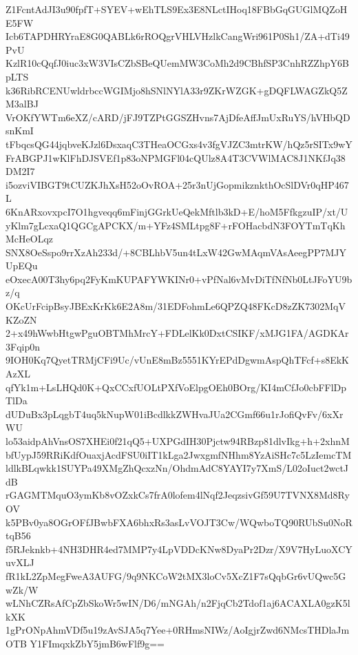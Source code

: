 Z1FcntAdJI3u90fpfT+SYEV+wEhTLS9Ex3E8NLctIHoq18FBbGqGUGlMQZoHE5FW
Icb6TAPDHRYraE8G0QABLk6rROQgrVHLVHzlkCangWri961P0Sh1/ZA+dTi49PvU
KzlR10cQqfJ0iuc3xW3VIsCZbSBeQUemMW3CoMh2d9CBhfSP3CnhRZZhpY6BpLTS
k36RibRCENUwldrbccWGIMjo8hSNlNYlA33r9ZKrWZGK+gDQFLWAGZkQ5ZM3alBJ
VrOKfYWTm6eXZ/cARD/jFJ9TZPtGGSZHvns7AjDfeAffJmUxRuYS/hVHbQDsnKmI
tFbqcsQG44jqbveKJzl6DsxaqC3THeaOCGxs4v3fgVJZC3mtrKW/hQz5rSITx9wY
FrABGPJ1wKlFhDJSVEf1p83oNPMGFl04cQUlz8A4T3CVWlMAC8J1NKfJq38DM2I7
i5ozviVIBGT9tCUZKJhXsH52oOvROA+25r3nUjGopmikznkthOcSlDVr0qHP467L
6KnARxovxpcI7O1hgveqq6mFinjGGrkUeQekMftlb3kD+E/hoM5FfkgzuIP/xt/U
yKlm7gLcxaQ1QGCgAPCKX/m+YFz4SMLtpg8F+rFOHacbdN3FOYTmTqKhMcHeOLqz
SNX8OeSspo9rrXzAh233d/+8CBLhbV5un4tLxW42GwMAqmVAsAeegPP7MJYUpEQu
eOxecA00T3hy6pq2FyKmKUPAFYWKINr0+vPfNal6vMvDiTfNfNb0LtJFoYU9bz/q
OKcUrFcipBsyJBExKrKk6E2A8m/31EDFohmLe6QPZQ48FKcD8zZK7302MqVKZoZN
2+x49hWwbHtgwPguOBTMhMrcY+FDLelKk0DxtCSIKF/xMJG1FA/AGDKAr3Fqip0n
9IOH0Kq7QyetTRMjCFi9Uc/vUnE8mBz5551KYrEPdDgwmAspQhTFcf+s8EkKAzXL
qfYk1m+LsLHQd0K+QxCCxfUOLtPXfVoElpgOEh0BOrg/KI4mCfJo0cbFFlDpTlDa
dUDuBx3pLqgbT4uq5kNupW01iBcdlkkZWHvaJUa2CGmf66u1rJofiQvFv/6xXrWU
lo53aidpAhVnsOS7XHEi0f21qQ5+UXPGdIH30Pjctw94RBzp81dlvIkg+h+2xhnM
bfUypJ59RRiKdfOuaxjAcdFSU0iIT1kLga2JwxgmfNHhm8YzAiSHc7c5LzIemcTM
ldlkBLqwkk1SUYPa49XMgZhQcxzNn/OhdmAdC8YAYI7y7XmS/L02oIuct2wctJdB
rGAGMTMquO3ymKb8vOZxkCs7frA0lofem4lNqf2JeqzsivGf59U7TVNX8Md8RyOV
k5PBv0ya8OGrOFfJBwbFXA6bhxRs3asLvVOJT3Cw/WQwboTQ90RUbSu0NoRtqB56
f5RJeknkb+4NH3DHR4ed7MMP7y4LpVDDcKNw8DyaPr2Dzr/X9V7HyLuoXCYuvXLJ
fR1kL2ZpMegFweA3AUFG/9q9NKCoW2tMX3loCv5XcZ1F7sQqbGr6vUQwc5GwZk/W
wLNhCZRsAfCpZbSkoWr5wIN/D6/mNGAh/n2FjqCb2Tdof1aj6ACAXLA0gzK5lkXK
1gPrONpAhmVDf5u19zAvSJA5q7Yee+0RHmsNIWz/AoIgjrZwd6NMcsTHDlaJmOTB
Y1FImqxkZbY5jmB6wFlf9g==
